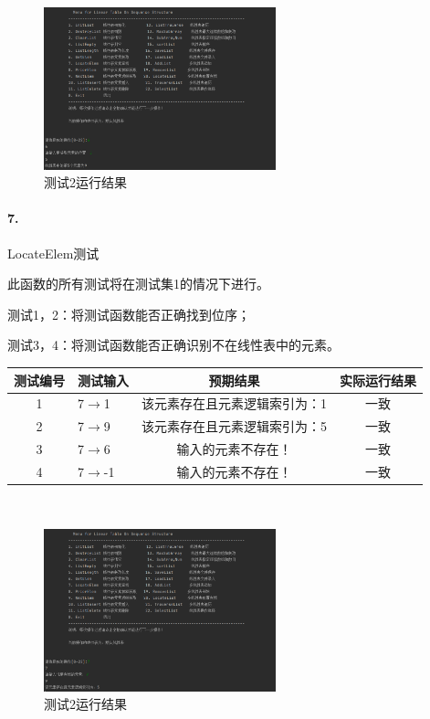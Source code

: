 \documentclass[supercite]{Experimental_Report}
\theoremstyle{definition}
\begin{document}
~\

 \begin{figure}[H]
 	\centering
 	\includegraphics[width=0.6\textwidth]{images/线性表测试6.png}
 	\caption{测试2运行结果}
 	\label{txlab}
 \end{figure}



\paragraph{ 7.}LocateElem测试

此函数的所有测试将在测试集1的情况下进行。

测试1，2：将测试函数能否正确找到位序；

测试3，4：将测试函数能否正确识别不在线性表中的元素。

\vspace{0.5em}

\begin{tabular}{|c|l|c|c|}
	\hline
	测试编号 & 测试输入 & 预期结果 & 实际运行结果 \\
	\hline
	1 & 7$\rightarrow$1 & 该元素存在且元素逻辑索引为：1 & 一致 \\
	\hline
	2 & 7$\rightarrow$9 & 该元素存在且元素逻辑索引为：5 & 一致 \\
	\hline
	3 & 7$\rightarrow$6 & 输入的元素不存在！ & 一致 \\
	\hline
	4 & 7$\rightarrow$-1 & 输入的元素不存在！ & 一致 \\
	\hline
\end{tabular}

~\

 \begin{figure}[H]
 	\centering
 	\includegraphics[width=0.6\textwidth]{images/线性表测试7.png}
 	\caption{测试2运行结果}
 	\label{txlab}
 \end{figure}
\end{document}
